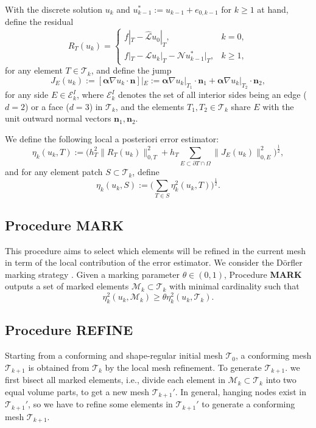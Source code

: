 \documentclass[preprint,times]{elsarticle}%
\numberwithin{algorithm}{section}
\numberwithin{equation}{section}
\newcommand{\vect}[1]{\boldsymbol{#1}}
\newcommand{\valpha}{\boldsymbol{\alpha}}
\newcommand{\hmcL}{\hat{\mathcal{L}}}
\newcommand{\mcE}{\mathcal{E}}
\newcommand{\mcL}{\mathcal{L}}
\newcommand{\mcM}{\mathcal{M}}
\newcommand{\mcN}{\mathcal{N}}
\newcommand{\mcT}{\mathcal{T}}
\newcommand{\LtwE}[1]{\|#1\|_{0,E}}
\def\geq{\geqslant}
\begin{document}
With the discrete solution $u_k$ and $u_{k-1}^*:= u_{k-1} + e_{0,k-1}$ for $k \geq 1$ at hand, define the residual
\begin{equation}\label{def-residual}
	R_T(u_k) = \begin{cases}
		f|_T - \hmcL u_0 |_T, & k = 0, \\
		f|_T - \mcL u_k|_T - \mcN u_{k-1}^* |_T, & k \geq 1, 
	\end{cases}
\end{equation}
for any element $T \in \mcT_k$, and define the jump 
\begin{equation}\label{jump}
	J_E(u_k) := [\valpha \nabla u_k \cdot \vect{n}]|_E := \valpha\nabla u_k|_{T_1} \cdot \vect{n}_1 + \valpha \nabla u_k |_{T_2} \cdot \vect{n}_2,
\end{equation}
for any side $E \in \mcE_k^I$, where $\mcE_k^I$ denotes the set of all interior sides being an edge ($d = 2$) or a face ($d = 3$) in $\mcT_k$, and  
the elements $T_1,T_2 \in \mcT_k$ share $E$ with the unit outward normal vectors $\vect{n}_1,\vect{n}_2$. 

We define the following local a posteriori error estimator: 
\begin{equation}\label{eta-T}
	\eta_k(u_k,T) := \Big(h_T^2 \|R_T(u_k)\|_{0,T}^2 + h_T 
	\sum_{E \subset \partial T \cap \Omega}\LtwE{J_E(u_k)}^2\Big)^\frac{1}{2}, 
\end{equation}	
 and for any element patch $S \subset \mcT_k$, define 
\begin{equation}\label{eta-D}
	\eta_k(u_k,S) := \Big(\sum_{T \in S} \eta_k^2 (u_k,T)\Big)^\frac{1}{2}.   
\end{equation}

\subsection{Procedure \textbf{MARK}}
This procedure aims to select which elements will be refined in the current mesh in term of the local contribution of the error estimator. We consider the D\"orfler marking strategy \cite{Dorfler96:1106}. Given a marking parameter $\theta \in (0,1)$, Procedure \textbf{MARK} outputs a set of marked elements $\mcM_k \subset \mcT_k$ with minimal cardinality such that 
\begin{equation}\label{mark}
	\eta_k^2(u_k,\mcM_k) \geq \theta \eta_k^2(u_k,\mcT_k).
\end{equation}

\subsection{Procedure \textbf{REFINE}}\label{part-refine}
Starting from a conforming and shape-regular initial mesh $\mcT_0$, a conforming mesh $\mcT_{k+1}$ is obtained from $\mcT_k$ by the local mesh refinement. To generate $\mcT_{k+1}$. we first bisect all marked elements, i.e., divide each element in $\mcM_k \subset \mcT_k$ into two equal volume parts, to get a new mesh $\mcT_{k+1}'$. In general, hanging nodes exist in $\mcT_{k+1}'$, so we have to refine some elements in $\mcT_{k+1}'$ to generate a conforming mesh $\mcT_{k+1}$. 
\end{document}
